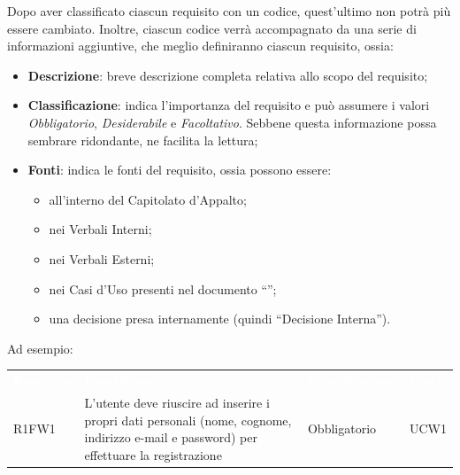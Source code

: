 Dopo aver classificato ciascun requisito con un codice, quest’ultimo non potrà più essere cambiato.
Inoltre, ciascun codice verrà accompagnato da una serie di informazioni aggiuntive, che meglio definiranno ciascun requisito, ossia:

\begin{itemize}
	\item \textbf{Descrizione}: breve descrizione completa relativa allo scopo del requisito;
	\item \textbf{Classificazione}: indica l’importanza del requisito e può assumere i valori \textit{Obbligatorio}, \textit{Desiderabile} e \textit{Facoltativo}. Sebbene questa informazione possa sembrare ridondante, ne facilita la lettura;
	\item \textbf{Fonti}: indica le fonti del requisito, ossia possono essere:
	\begin{itemize}
		\item all'interno del Capitolato d’Appalto;
		\item nei Verbali Interni;
		\item nei Verbali Esterni;
		\item nei Casi d’Uso presenti nel documento “\AdR”;
		\item una decisione presa internamente (quindi “Decisione Interna”).
	\end{itemize}	 
\end{itemize}

Ad esempio:\\

\begin{table}[!htbp]
\renewcommand{\arraystretch}{1.5}
\begin{tabular}{ m{}<{\centering}  m{}<{\centering}  m{}<{\centering}  m{}<{\centering}}
    \rowcolor{darkblue}
    \textcolor{white}{\textbf{Requisito}} &\textcolor{white}{\textbf{Descrizione}}& \textcolor{white}{\textbf{Classificazione}} & \textcolor{white}{\textbf{Fonti}}\\ 

    \rowcolor{gray!25} R1FW1 & L’utente deve riuscire ad inserire i propri dati personali (nome, cognome, indirizzo e-mail e password) per effettuare la registrazione & Obbligatorio & UCW1 \\

\end{tabular}
\end{table}

